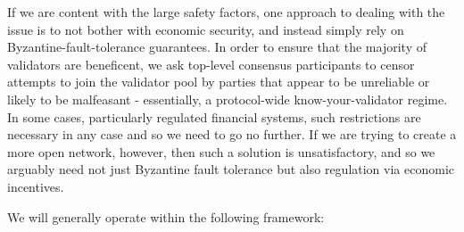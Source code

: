 \documentclass[11pt,a4paper]{article}
\theoremstyle{plain}
\theoremstyle{definition}
\theoremstyle{remark}
\begin{document}
If we are content with the large safety factors, one approach to dealing with the issue is to not bother with economic security, and instead simply rely on Byzantine-fault-tolerance guarantees. In order to ensure that the majority of validators are beneficent, we ask top-level consensus participants to censor attempts to join the validator pool by parties that appear to be unreliable or likely to be malfeasant - essentially, a protocol-wide know-your-validator regime. In some cases, particularly regulated financial systems, such restrictions are necessary in any case and so we need to go no further\cite{swanson}. If we are trying to create a more open network, however, then such a solution is unsatisfactory, and so we arguably need not just Byzantine fault tolerance but also regulation via economic incentives.

We will generally operate within the following framework:
\end{document}
